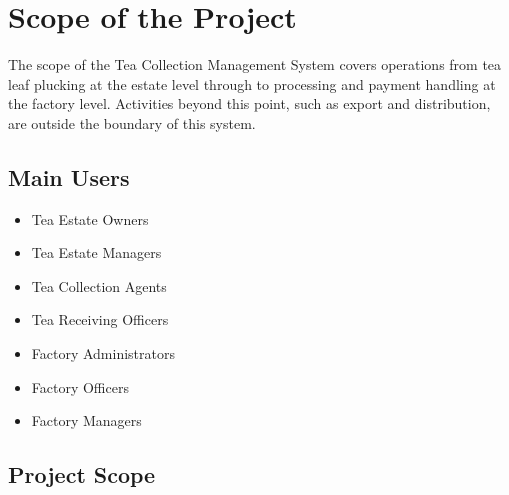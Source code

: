\section{Scope of the Project}
\label{sec:scope}

The scope of the Tea Collection Management System covers operations from tea leaf plucking at the estate level through to processing and payment handling at the factory level. Activities beyond this point, such as export and distribution, are outside the boundary of this system.
\subsection{Main Users}
\begin{itemize}
    \item Tea Estate Owners
    \item Tea Estate Managers
    \item Tea Collection Agents
    \item Tea Receiving Officers
    \item Factory Administrators
    \item Factory Officers
    \item Factory Managers
\end{itemize}

\subsection{Project Scope}

